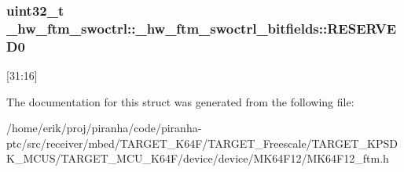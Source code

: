 \subsubsection[{\texorpdfstring{R\+E\+S\+E\+R\+V\+E\+D0}{RESERVED0}}]{\setlength{\rightskip}{0pt plus 5cm}uint32\+\_\+t \+\_\+hw\+\_\+ftm\+\_\+swoctrl\+::\+\_\+hw\+\_\+ftm\+\_\+swoctrl\+\_\+bitfields\+::\+R\+E\+S\+E\+R\+V\+E\+D0}\hypertarget{struct__hw__ftm__swoctrl_1_1__hw__ftm__swoctrl__bitfields_abf73719eb7220c12d341180b63208b83}{}\label{struct__hw__ftm__swoctrl_1_1__hw__ftm__swoctrl__bitfields_abf73719eb7220c12d341180b63208b83}
\mbox{[}31\+:16\mbox{]} 

The documentation for this struct was generated from the following file\+:\begin{DoxyCompactItemize}
\item 
/home/erik/proj/piranha/code/piranha-\/ptc/src/receiver/mbed/\+T\+A\+R\+G\+E\+T\+\_\+\+K64\+F/\+T\+A\+R\+G\+E\+T\+\_\+\+Freescale/\+T\+A\+R\+G\+E\+T\+\_\+\+K\+P\+S\+D\+K\+\_\+\+M\+C\+U\+S/\+T\+A\+R\+G\+E\+T\+\_\+\+M\+C\+U\+\_\+\+K64\+F/device/device/\+M\+K64\+F12/M\+K64\+F12\+\_\+ftm.\+h\end{DoxyCompactItemize}
